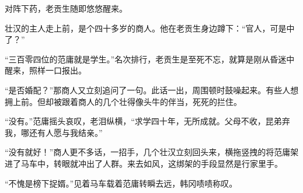 对阵下药，老贡生随即悠悠醒来。

壮汉的主人走上前，是个四十多岁的商人。他在老贡生身边蹲下：“官人，可是中了？”

“三百零四位的范庸就是学生。”名次排行，老贡生是至死不忘，就算是刚从昏迷中醒来，照样一口报出。

“是否婚配？”那商人又立刻追问了一句。此话一出，周围顿时鼓噪起来。有些人想拥上前。但却被跟着商人的几个壮得像头牛的伴当，死死的拦住。

“没有。”范庸摇头哀叹，老泪纵横，“求学四十年，无所成就。父母不收，昆弟弃我，哪还有人愿与我结亲。”

“没有就好！”商人更不多话，一招手，几个壮汉立刻回头来，横拖竖拽的将范庸架进了马车中，转眼就冲出了人群。来去如风，这绑架的手段显然是行家里手。

“不愧是榜下捉婿。”见着马车载着范庸转瞬去远，韩冈啧啧称叹。


